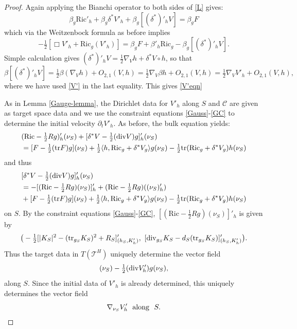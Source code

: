 \documentclass[10pt]{amsart}
\renewcommand{\b}{\beta}
\renewcommand{\d}{\delta}
\newcommand{\cC}{{\mathcal C}}
\newcommand{\cT}{{\mathcal T}}
\newcommand{\Ric}{\mathrm{Ric}}
\newcommand{\be}{\begin{equation}}
\newcommand{\ee}{\end{equation}}
\newcommand{\bes}{\begin{equation*}}
\newcommand{\ees}{\end{equation*}}
\newcommand{\tr}{\mathrm{tr}}
\newcommand{\p}{\partial}
\newcommand{\<}{\langle}
\renewcommand{\>}{\rangle}
\theoremstyle{plain}
\theoremstyle{remark}
\theoremstyle{definition}
\numberwithin{equation}{section}
\begin{document}
\begin{proof}
Again applying the Bianchi operator to both sides of \eqref{L} gives:
\bes
\b_g \Ric'_h+\b_g \d^* V'_h+\b_g[(\d^*)'_h V]=\b_g F
\ees
which via the Weitzenbock formula as before implies 
\be \label{V'1}
-\tfrac{1}{2}[\Box V'_h+\Ric_g(V'_h)]=\b_g F + \b'_h \Ric_g -\b_g[(\d^*)'_h V].
\ee
Simple calculation gives $(\d^*)'_hV = \frac{1}{2}\nabla_V h + \d^*V\circ h$, so that 
 $$\b[(\d^*)'_hV] = \tfrac{1}{2}\b(\nabla_Vh) + O_{2,1}(V,h) = \tfrac{1}{2}\nabla_V \b h + O_{2,1}(V,h) = \tfrac{1}{2}\nabla_V V'_h + O_{2,1}(V,h),$$
where we have used \eqref{V'} in the last equality. This gives \eqref{V'eqn} 

  As in Lemma \ref{Gauge-lemma}, the Dirichlet data for $V'_h$ along $S$ and $\cC$ are given as target space data and we use the 
constraint equations \eqref{Gauss}-\eqref{GC} to determine the initial velocity $\p_t V'_h$. As before, the bulk equation yields:
\bes
\begin{split}
&(\Ric-\tfrac{1}{2}Rg)'_h(\nu_S)+[\d^*V-\tfrac{1}{2}({\rm div}V)g]'_h(\nu_S)\\
&=[F-\tfrac{1}{2}(\tr F)g](\nu_S)+\tfrac{1}{2}\<h,\Ric_g+\d^* V_g\>g(\nu_S)-
\tfrac{1}{2}\tr(\Ric_g+\d^* V_g)h(\nu_S)
\end{split}\ees
and thus
\bes\begin{split}
&[\d^*V-\tfrac{1}{2}({\rm div}V)g]'_h(\nu_S)\\
&=-[(\Ric-\tfrac{1}{2}Rg)(\nu_S)]'_h+(\Ric-\tfrac{1}{2}Rg)((\nu_S)'_h)\\
&+[F-\tfrac{1}{2}(\tr F)g](\nu_S)+\tfrac{1}{2}\<h,\Ric_g+\d^* V_g\>g(\nu_S)-
\tfrac{1}{2}\tr(\Ric_g+\d^* V_g)h(\nu_S)
\end{split}\ees
on $S$.
By the constraint equations \eqref{Gauss}-\eqref{GC}, $[(\Ric-\tfrac{1}{2}Rg)(\nu_S)]'_h$ is given by 
\bes
\big(-\tfrac{1}{2}[|K_S|^2-(\tr_{g_S}K_S)^2+R_S]'_{(h_S,K'_h)},~[{\rm div}_{g_S}K_S-d_S(\tr_{g_S}K_S)]'_{(h_S,K'_h)}\big).
\ees
Thus the target data in $T(\cT^H)$ uniquely determine the vector field 
\bes
[\d^*V'_h](\nu_S)-\tfrac{1}{2}({\rm div}V'_h)g(\nu_S),
\ees
along $S$. Since the initial data of $V'_h$ is already determined, this uniquely determines the vector field 
\be
\nabla_{\nu_S} V'_h \ \ {\rm along} \ \ S.
\ee

\end{proof}
\end{document}
